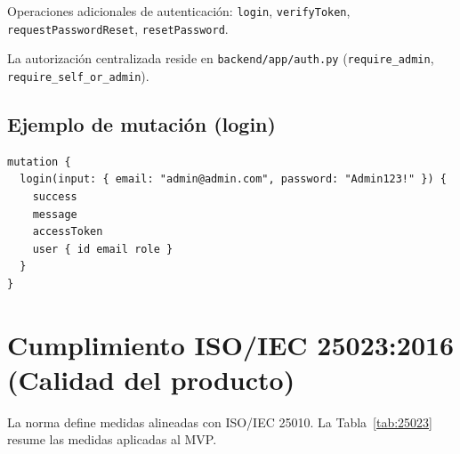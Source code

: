 \documentclass[11pt,a4paper]{article}
\begin{document}
Operaciones adicionales de autenticación: \texttt{login}, \texttt{verifyToken}, \texttt{requestPasswordReset}, \texttt{resetPassword}.

La autorización centralizada reside en \texttt{backend/app/auth.py} (\texttt{require\_admin}, \texttt{require\_self\_or\_admin}).

\subsection{Ejemplo de mutación (login)}
\begin{lstlisting}[language={},basicstyle=\ttfamily\footnotesize]
mutation {
  login(input: { email: "admin@admin.com", password: "Admin123!" }) {
    success
    message
    accessToken
    user { id email role }
  }
}
\end{lstlisting}

\section{Cumplimiento ISO/IEC 25023:2016 (Calidad del producto)}

La norma define medidas alineadas con ISO/IEC 25010. La Tabla~\ref{tab:25023} resume las medidas aplicadas al MVP.
\end{document}
